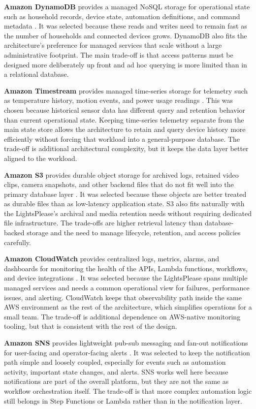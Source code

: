 \textbf{Amazon DynamoDB} provides a managed NoSQL storage for operational state such as household records, device state, automation definitions, and command metadata \cite{aws-dynamodb}. It was selected because these reads and writes need to remain fast as the number of households and connected devices grows. DynamoDB also fits the architecture's preference for managed services that scale without a large administrative footprint. The main trade-off is that access patterns must be designed more deliberately up front and ad hoc querying is more limited than in a relational database.

\textbf{Amazon Timestream} provides managed time-series storage for telemetry such as temperature history, motion events, and power usage readings \cite{aws-timestream}. This was chosen because historical sensor data has different query and retention behavior than current operational state. Keeping time-series telemetry separate from the main state store allows the architecture to retain and query device history more efficiently without forcing that workload into a general-purpose database. The trade-off is additional architectural complexity, but it keeps the data layer better aligned to the workload.

\textbf{Amazon S3} provides durable object storage for archived logs, retained video clips, camera snapshots, and other backend files that do not fit well into the primary database layer \cite{aws-s3}. It was selected because these objects are better treated as durable files than as low-latency application state. S3 also fits naturally with the LightsPlease's archival and media retention needs without requiring dedicated file infrastructure. The trade-offs are higher retrieval latency than database-backed storage and the need to manage lifecycle, retention, and access policies carefully.

\textbf{Amazon CloudWatch} provides centralized logs, metrics, alarms, and dashboards for monitoring the health of the APIs, Lambda functions, workflows, and device integrations \cite{aws-cloudwatch}. It was selected because the LightsPlease spans multiple managed services and needs a common operational view for failures, performance issues, and alerting. CloudWatch keeps that observability path inside the same AWS environment as the rest of the architecture, which simplifies operations for a small team. The trade-off is additional dependence on AWS-native monitoring tooling, but that is consistent with the rest of the design.

\textbf{Amazon SNS} provides lightweight pub-sub messaging and fan-out notifications for user-facing and operator-facing alerts \cite{aws-sns}. It was selected to keep the notification path simple and loosely coupled, especially for events such as automation activity, important state changes, and alerts. SNS works well here because notifications are part of the overall platform, but they are not the same as workflow orchestration itself. The trade-off is that more complex automation logic still belongs in Step Functions or Lambda rather than in the notification layer.
